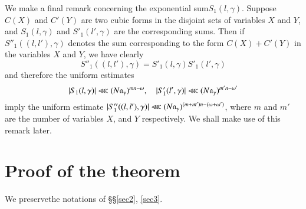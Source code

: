 We make a final remark concerning the exponential sum\break $S_1(l,\gamma)$. Suppose $C(X)$ and $C'(Y)$ are two cubic forms in the disjoint sets of variables $X$ and $Y$, and $S_1 (l, \gamma)$ and $S'_1 (l',\gamma)$ are the corresponding sums. Then if $S''_1 ((l,l'), \gamma)$ denotes the sum corresponding to the form $C(X)+ C'(Y)$ in the variables $X$ and $Y$, we have clearly
$$
S''_1 ((l,l'), \gamma) = S'_1 (l, \gamma) S'_1 (l',\gamma)
$$
and therefore the uniform estimates 
$$
|S_1 (l,\gamma)| \lll (N\mathfrak{a}_\gamma)^{mn-\omega},\quad |S'_1 (l',\gamma)| \lll (N\mathfrak{a}_\gamma)^{m'n-\omega'}
$$ 
imply the uniform estimate $|S''_1 ((l,l'), \gamma)| \lll (N\mathfrak{a}_\gamma)^{(m+m')n - (\omega+\omega')}$, where $m$ and $m'$ are the number of variables $X$, and $Y$ respectively. We shall make use of this remark later.

\vskip 0.2cm
\noindent
\section{Proof of the theorem} We preserve\pageoriginale the notations of \S \S \ref{sec2}, \ref{sec3}.

